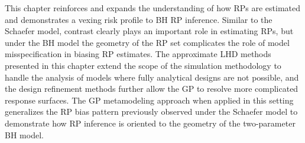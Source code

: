 
This chapter reinforces and expands the understanding of how RPs are estimated
and demonstrates a vexing risk profile to BH RP inference.
%
Similar to the Schaefer model, contrast clearly plays an important role in 
estimating RPs, but under the BH model the geometry of the RP set complicates 
the role of model misspecification in biasing RP estimates. 
The approximate LHD methods presented in this chapter extend the scope of the 
simulation methodology to handle the analysis of models where fully analytical 
designs are not possible, and the design refinement methods further allow the GP 
to resolve more complicated response surfaces. %
The GP metamodeling approach when applied in this setting generalizes the RP 
bias pattern previously observed under the Schaefer model to demonstrate how 
RP inference is oriented to the geometry of the two-parameter BH model.  





